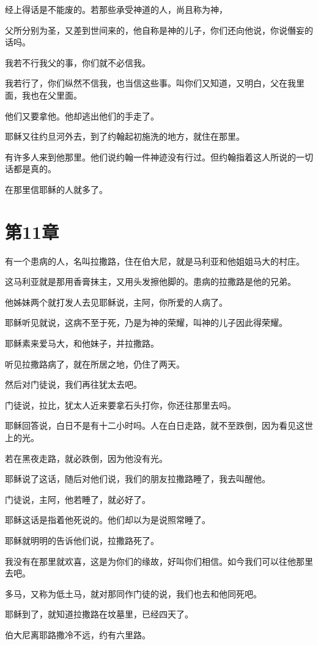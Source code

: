 \documentclass[12pt,oneside]{book}
\begin{document}
经上得话是不能废的。若那些承受神道的人，尚且称为神，

父所分别为圣，又差到世间来的，他自称是神的儿子，你们还向他说，你说僭妄的话吗。

我若不行我父的事，你们就不必信我。

我若行了，你们纵然不信我，也当信这些事。叫你们又知道，又明白，父在我里面，我也在父里面。

他们又要拿他。他却逃出他们的手走了。

耶稣又往约旦河外去，到了约翰起初施洗的地方，就住在那里。

有许多人来到他那里。他们说约翰一件神迹没有行过。但约翰指着这人所说的一切话都是真的。

在那里信耶稣的人就多了。

\chapter{第11章}
有一个患病的人，名叫拉撒路，住在伯大尼，就是马利亚和他姐姐马大的村庄。

这马利亚就是那用香膏抹主，又用头发擦他脚的。患病的拉撒路是他的兄弟。

他姊妹两个就打发人去见耶稣说，主阿，你所爱的人病了。

耶稣听见就说，这病不至于死，乃是为神的荣耀，叫神的儿子因此得荣耀。

耶稣素来爱马大，和他妹子，并拉撒路。

听见拉撒路病了，就在所居之地，仍住了两天。

然后对门徒说，我们再往犹太去吧。

门徒说，拉比，犹太人近来要拿石头打你，你还往那里去吗。

耶稣回答说，白日不是有十二小时吗。人在白日走路，就不至跌倒，因为看见这世上的光。

若在黑夜走路，就必跌倒，因为他没有光。

耶稣说了这话，随后对他们说，我们的朋友拉撒路睡了，我去叫醒他。

门徒说，主阿，他若睡了，就必好了。

耶稣这话是指着他死说的。他们却以为是说照常睡了。

耶稣就明明的告诉他们说，拉撒路死了。

我没有在那里就欢喜，这是为你们的缘故，好叫你们相信。如今我们可以往他那里去吧。

多马，又称为低土马，就对那同作门徒的说，我们也去和他同死吧。

耶稣到了，就知道拉撒路在坟墓里，已经四天了。

伯大尼离耶路撒冷不远，约有六里路。
\end{document}
